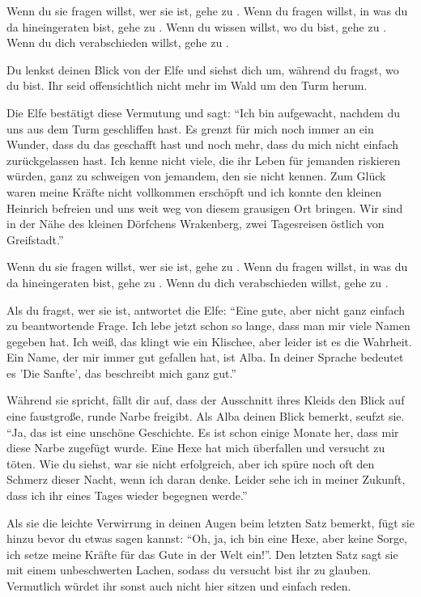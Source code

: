Wenn du sie fragen willst, wer sie ist, gehe zu . Wenn du fragen willst, in was du da hineingeraten bist, gehe zu . Wenn du wissen willst, wo du bist, gehe zu . Wenn du dich verabschieden willst, gehe zu .


Du lenkst deinen Blick von der Elfe und siehst dich um, während du fragst, wo du bist. Ihr seid offensichtlich nicht mehr im Wald um den Turm herum.

Die Elfe bestätigt diese Vermutung und sagt: ``Ich bin aufgewacht, nachdem du uns aus dem Turm geschliffen hast.
Es grenzt für mich noch immer an ein Wunder, dass du das geschafft hast und noch mehr, dass du mich nicht einfach zurückgelassen hast.
Ich kenne nicht viele, die ihr Leben für jemanden riskieren würden, ganz zu schweigen von jemandem, den sie nicht kennen.
Zum Glück waren meine Kräfte nicht vollkommen erschöpft und ich konnte den kleinen Heinrich befreien und uns weit weg von diesem grausigen Ort bringen.
Wir sind in der Nähe des kleinen Dörfchens Wrakenberg, zwei Tagesreisen östlich von Greifstadt.''

Wenn du sie fragen willst, wer sie ist, gehe zu . Wenn du fragen willst, in was du da hineingeraten bist, gehe zu . Wenn du dich verabschieden willst, gehe zu .


Als du fragst, wer sie ist, antwortet die Elfe: ``Eine gute, aber nicht ganz einfach zu beantwortende Frage. Ich lebe jetzt schon so lange, dass man mir viele Namen gegeben hat.
Ich weiß, das klingt wie ein Klischee, aber leider ist es die Wahrheit.
Ein Name, der mir immer gut gefallen hat, ist Alba.
In deiner Sprache bedeutet es 'Die Sanfte', das beschreibt mich ganz gut.''

Während sie spricht, fällt dir auf, dass der Ausschnitt ihres Kleids den Blick auf eine faustgroße, runde Narbe freigibt. Als Alba deinen Blick bemerkt, seufzt sie. ``Ja, das ist eine unschöne Geschichte. Es ist schon einige Monate her, dass mir diese Narbe zugefügt wurde. Eine Hexe hat mich überfallen und versucht zu töten. Wie du siehst, war sie nicht erfolgreich, aber ich spüre noch oft den Schmerz dieser Nacht, wenn ich daran denke. Leider sehe ich in meiner Zukunft, dass ich ihr eines Tages wieder begegnen werde.''

Als sie die leichte Verwirrung in deinen Augen beim letzten Satz bemerkt, fügt sie hinzu bevor du etwas sagen kannst: ``Oh, ja, ich bin eine Hexe, aber keine Sorge, ich setze meine Kräfte für das Gute in der Welt ein!''. Den letzten Satz sagt sie mit einem unbeschwerten Lachen, sodass du versucht bist ihr zu glauben. Vermutlich würdet ihr sonst auch nicht hier sitzen und einfach reden.

